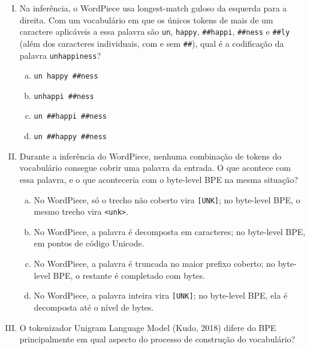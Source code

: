 \documentclass{dlproblemset}
\begin{document}
\begin{enumerate}[I)]
\item Na inferência, o WordPiece usa longest-match guloso da esquerda para a direita.
      Com um vocabulário em que os únicos tokens de mais de um caractere
      aplicáveis a essa palavra são \texttt{un}, \texttt{happy},
      \texttt{\#\#happi}, \texttt{\#\#ness} e \texttt{\#\#ly} (além dos
      caracteres individuais, com e sem \texttt{\#\#}),
      qual é a codificação da palavra \texttt{unhappiness}?

\begin{enumerate}[a)]
    \item \texttt{un}~\texttt{happy}~\texttt{\#\#ness}
    \item \texttt{unhappi}~\texttt{\#\#ness}
    \item \texttt{un}~\texttt{\#\#happi}~\texttt{\#\#ness}
    \item \texttt{un}~\texttt{\#\#happy}~\texttt{\#\#ness}
\end{enumerate}

\item Durante a inferência do WordPiece, nenhuma combinação de tokens do vocabulário
      consegue cobrir uma palavra da entrada. O que acontece com essa palavra, e o
      que aconteceria com o byte-level BPE na mesma situação?

\begin{enumerate}[a)]
    \item No WordPiece, só o trecho não coberto vira \texttt{[UNK]}; no byte-level
          BPE, o mesmo trecho vira \texttt{<unk>}.
    \item No WordPiece, a palavra é decomposta em caracteres; no byte-level BPE,
          em pontos de código Unicode.
    \item No WordPiece, a palavra é truncada no maior prefixo coberto; no byte-level
          BPE, o restante é completado com bytes.
    \item No WordPiece, a palavra inteira vira \texttt{[UNK]}; no byte-level BPE,
          ela é decomposta até o nível de bytes.
\end{enumerate}

\item O tokenizador Unigram Language Model (Kudo, 2018) difere do BPE principalmente
      em qual aspecto do processo de construção do vocabulário?


\end{enumerate}
\end{document}
